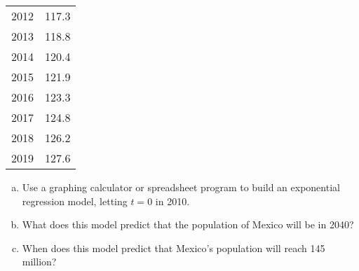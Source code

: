 \begin{exercises}
{\begin{center}
\begin{tabular}{c c}
2012 & 117.3\\
2013 & 118.8\\
2014 & 120.4\\
2015 & 121.9\\
2016 & 123.3\\
2017 & 124.8\\
2018 & 126.2\\
2019 & 127.6
\end{tabular}
\end{center}
\begin{enumerate}[(a)]
\item Use a graphing calculator or spreadsheet program to build an exponential regression model, letting $t=0$ in 2010.
\item What does this model predict that the population of Mexico will be in 2040?
\item When does this model predict that Mexico's population will reach 145 million?
\end{enumerate}}

\end{exercises}
